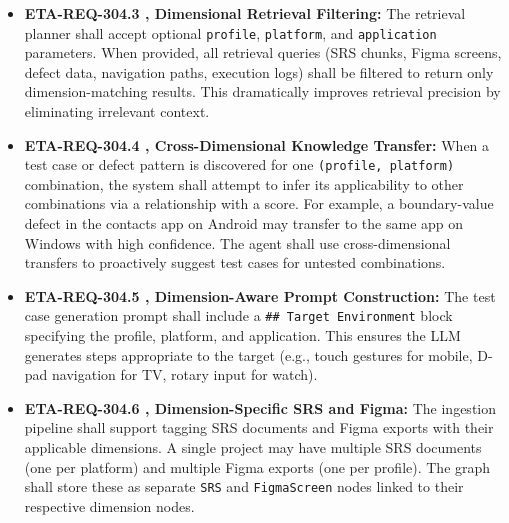 \begin{itemize}[leftmargin=1.4em,itemsep=1pt,topsep=3pt]
  \item \textbf{ETA-REQ-304.3 ,  Dimensional Retrieval Filtering:} The retrieval planner shall accept optional \texttt{profile}, \texttt{platform}, and \texttt{application} parameters. When provided, all retrieval queries (SRS chunks, Figma screens, defect data, navigation paths, execution logs) shall be filtered to return only dimension-matching results. This dramatically improves retrieval precision by eliminating irrelevant context.
\end{itemize}

\begin{itemize}[leftmargin=1.4em,itemsep=1pt,topsep=3pt]
  \item \textbf{ETA-REQ-304.4 ,  Cross-Dimensional Knowledge Transfer:} When a test case or defect pattern is discovered for one \texttt{(profile, platform)} combination, the system shall attempt to infer its applicability to other combinations via a  relationship with a  score. For example, a boundary-value defect in the contacts app on Android may transfer to the same app on Windows with high confidence. The agent shall use cross-dimensional transfers to proactively suggest test cases for untested combinations.
\end{itemize}

\begin{itemize}[leftmargin=1.4em,itemsep=1pt,topsep=3pt]
  \item \textbf{ETA-REQ-304.5 ,  Dimension-Aware Prompt Construction:} The test case generation prompt shall include a \texttt{\#\# Target Environment} block specifying the profile, platform, and application. This ensures the LLM generates steps appropriate to the target (e.g., touch gestures for mobile, D-pad navigation for TV, rotary input for watch).
\end{itemize}

\begin{itemize}[leftmargin=1.4em,itemsep=1pt,topsep=3pt]
  \item \textbf{ETA-REQ-304.6 ,  Dimension-Specific SRS and Figma:} The ingestion pipeline shall support tagging SRS documents and Figma exports with their applicable dimensions. A single project may have multiple SRS documents (one per platform) and multiple Figma exports (one per profile). The graph shall store these as separate \texttt{SRS} and \texttt{FigmaScreen} nodes linked to their respective dimension nodes.
\end{itemize}

